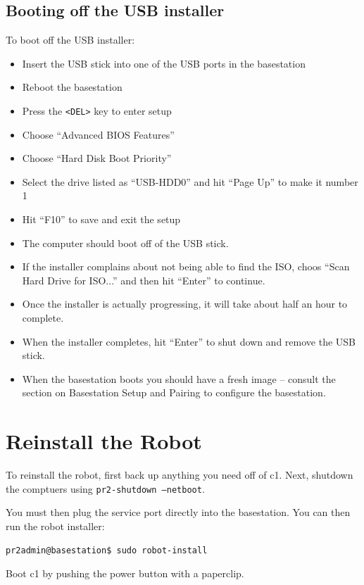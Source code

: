 \subsection{Booting off the USB installer}
To boot off the USB installer:
\begin{itemize}
\item Insert the USB stick into one of the USB ports in the basestation
\item Reboot the basestation
\item Press the \texttt{<DEL>} key to enter setup
\item Choose ``Advanced BIOS Features''
\item Choose ``Hard Disk Boot Priority''
\item Select the drive listed as ``USB-HDD0'' and hit ``Page Up'' to make it number 1
\item Hit ``F10'' to save and exit the setup
\item The computer should boot off of the USB stick.
\item If the installer complains about not being able to find the ISO,
  choos ``Scan Hard Drive for ISO...'' and then hit ``Enter'' to
  continue.
\item Once the installer is actually progressing, it will take about half an hour to complete.
\item When the installer completes, hit ``Enter'' to shut down and remove the USB stick.
\item When the basestation boots you should have a fresh image -- consult the section on Basestation Setup and Pairing to configure the basestation.
\end{itemize}

\section{Reinstall the Robot}

To reinstall the robot, first back up anything you need off of c1.
Next, shutdown the comptuers using \texttt{pr2-shutdown --netboot}.

You must then plug the service port directly into the basestation.
You can then run the robot installer:

\begin{verbatim}
pr2admin@basestation$ sudo robot-install
\end{verbatim}

Boot c1 by pushing the power button with a paperclip.

